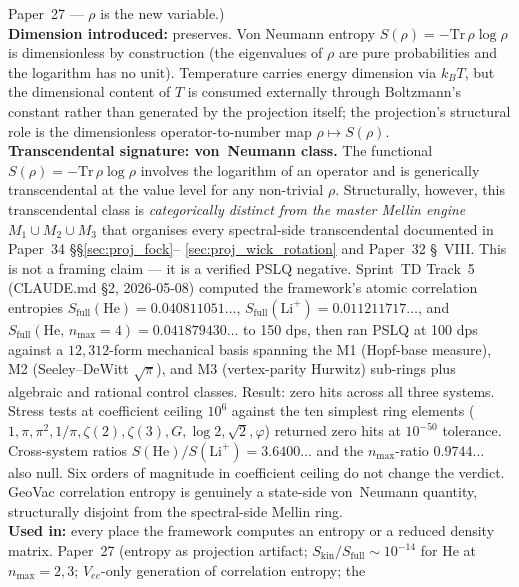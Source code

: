 Paper~27 --- $\rho$ is the new variable.)\\
\textbf{Dimension introduced:} preserves.  Von Neumann entropy
$S(\rho) = -\mathrm{Tr}\,\rho\log\rho$ is dimensionless by
construction (the eigenvalues of $\rho$ are pure probabilities and the
logarithm has no unit).  Temperature carries energy dimension via
$k_B T$, but the dimensional content of $T$ is consumed externally
through Boltzmann's constant rather than generated by the projection
itself; the projection's structural role is the dimensionless
operator-to-number map $\rho \mapsto S(\rho)$.\\
\textbf{Transcendental signature: von~Neumann class.}  The functional
$S(\rho) = -\mathrm{Tr}\,\rho\log\rho$ involves the logarithm of an
operator and is generically transcendental at the value level for any
non-trivial $\rho$.  Structurally, however, this transcendental class
is \emph{categorically distinct from the master Mellin engine}
$M_1 \cup M_2 \cup M_3$ that organises every spectral-side
transcendental documented in Paper~34 \S\S\ref{sec:proj_fock}--%
\ref{sec:proj_wick_rotation} and Paper~32 \S~VIII.  This is not a
framing claim --- it is a verified PSLQ negative.  Sprint~TD Track~5
(CLAUDE.md \S2, 2026-05-08) computed the framework's atomic
correlation entropies $S_\mathrm{full}(\mathrm{He}) =
0.040811051\ldots$, $S_\mathrm{full}(\mathrm{Li}^+) =
0.011211717\ldots$, and $S_\mathrm{full}(\mathrm{He},\, n_{\max}{=}4)
= 0.041879430\ldots$ to 150 dps, then ran PSLQ at 100 dps against a
$12{,}312$-form mechanical basis spanning the M1 (Hopf-base measure),
M2 (Seeley--DeWitt $\sqrt{\pi}$), and M3 (vertex-parity Hurwitz)
sub-rings plus algebraic and rational control classes.  Result: zero
hits across all three systems.  Stress tests at coefficient ceiling
$10^6$ against the ten simplest ring elements ($1, \pi, \pi^2, 1/\pi,
\zeta(2), \zeta(3), G, \log 2, \sqrt{2}, \varphi$) returned zero hits
at $10^{-50}$ tolerance.  Cross-system ratios
$S(\mathrm{He})/S(\mathrm{Li}^+) = 3.6400\ldots$ and the
$n_{\max}$-ratio $0.9744\ldots$ also null.  Six orders of magnitude in
coefficient ceiling do not change the verdict.  GeoVac correlation
entropy is genuinely a state-side von~Neumann quantity, structurally
disjoint from the spectral-side Mellin ring.\\
\textbf{Used in:} every place the framework computes an entropy or a
reduced density matrix.  Paper~27 (entropy as projection artifact;
$S_\mathrm{kin}/S_\mathrm{full} \sim 10^{-14}$ for He at
$n_{\max}=2,3$; $V_{ee}$-only generation of correlation entropy; the
